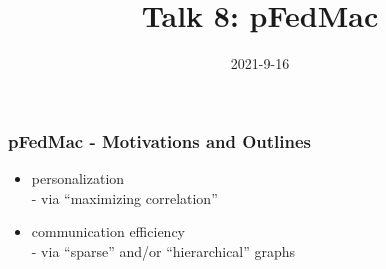 \usepackage{nccmath}




\title[pFedMac]{Talk 8: pFedMac}
\date{2021-9-16}




\setlength{\belowdisplayskip}{5pt} \setlength{\belowdisplayshortskip}{5pt}
\setlength{\abovedisplayskip}{5pt} \setlength{\abovedisplayshortskip}{5pt}


\begin{frame}
\titlepage %
\end{frame}


\begin{frame}
\frametitle{pFedMac - Motivations and Outlines}

{\large
\begin{itemize}
    \item personalization \\
    - via ``maximizing correlation''
    \vspace{1em}
    \item communication efficiency \\
    - via ``sparse'' and/or ``hierarchical'' graphs
\end{itemize}
}


\end{frame}


